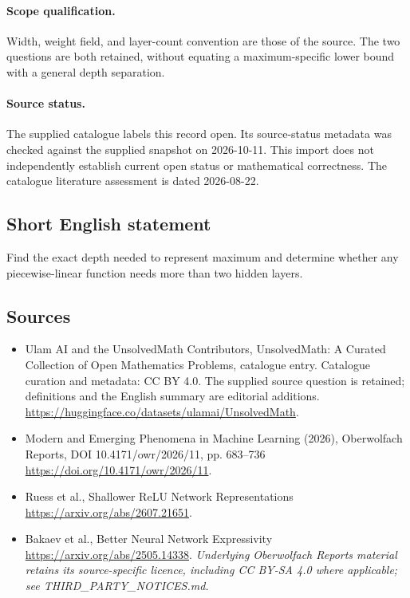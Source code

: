 \documentclass[11pt]{article}
\begin{document}
\paragraph{Scope qualification.}
Width, weight field, and layer-count convention are those of the source. The two questions are both retained, without equating a maximum-specific lower bound with a general depth separation.
\paragraph{Source status.}
The supplied catalogue labels this record open. Its source-status metadata was checked against the supplied snapshot on 2026-10-11. This import does not independently establish current open status or mathematical correctness. The catalogue literature assessment is dated 2026-08-22.
\subsection{Short English statement}
Find the exact depth needed to represent maximum and determine whether any piecewise-linear function needs more than two hidden layers.
\subsection{Sources}
\begin{itemize}
\item[S1] Ulam AI and the UnsolvedMath Contributors, UnsolvedMath: A Curated Collection of Open Mathematics Problems, catalogue entry. Catalogue curation and metadata: CC BY 4.0. The supplied source question is retained; definitions and the English summary are editorial additions.
\url{https://huggingface.co/datasets/ulamai/UnsolvedMath}.
\item[S2] Modern and Emerging Phenomena in Machine Learning (2026), Oberwolfach Reports, DOI 10.4171/owr/2026/11, pp. 683--736
\url{https://doi.org/10.4171/owr/2026/11}.
\item[S3] Ruess et al., Shallower ReLU Network Representations
\url{https://arxiv.org/abs/2607.21651}.
\item[S4] Bakaev et al., Better Neural Network Expressivity
\url{https://arxiv.org/abs/2505.14338}.
\textit{Underlying Oberwolfach Reports material retains its source-specific licence, including CC BY-SA 4.0 where applicable; see THIRD\_PARTY\_NOTICES.md.}
\end{itemize}
\end{document}
